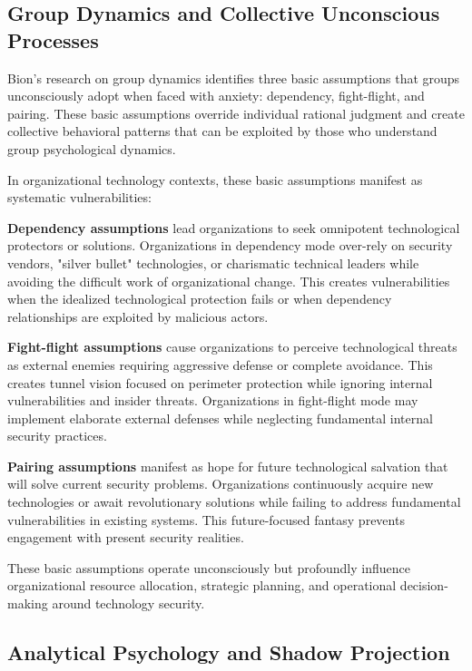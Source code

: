 \documentclass[10pt, twocolumn]{article}
\begin{document}
\subsection{Group Dynamics and Collective Unconscious Processes}

Bion's research on group dynamics \cite{bion1961} identifies three basic assumptions that groups unconsciously adopt when faced with anxiety: dependency, fight-flight, and pairing. These basic assumptions override individual rational judgment and create collective behavioral patterns that can be exploited by those who understand group psychological dynamics.

In organizational technology contexts, these basic assumptions manifest as systematic vulnerabilities:

\textbf{Dependency assumptions} lead organizations to seek omnipotent technological protectors or solutions. Organizations in dependency mode over-rely on security vendors, "silver bullet" technologies, or charismatic technical leaders while avoiding the difficult work of organizational change. This creates vulnerabilities when the idealized technological protection fails or when dependency relationships are exploited by malicious actors.

\textbf{Fight-flight assumptions} cause organizations to perceive technological threats as external enemies requiring aggressive defense or complete avoidance. This creates tunnel vision focused on perimeter protection while ignoring internal vulnerabilities and insider threats. Organizations in fight-flight mode may implement elaborate external defenses while neglecting fundamental internal security practices.

\textbf{Pairing assumptions} manifest as hope for future technological salvation that will solve current security problems. Organizations continuously acquire new technologies or await revolutionary solutions while failing to address fundamental vulnerabilities in existing systems. This future-focused fantasy prevents engagement with present security realities.

These basic assumptions operate unconsciously but profoundly influence organizational resource allocation, strategic planning, and operational decision-making around technology security.

\subsection{Analytical Psychology and Shadow Projection}
\end{document}
